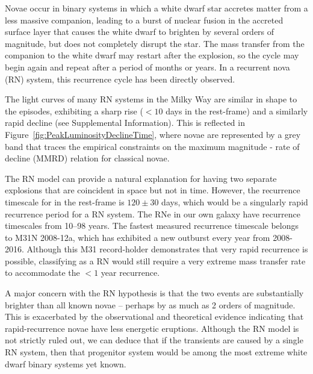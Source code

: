 \begin{multicols}{2}
Novae occur in binary systems in which a white dwarf star accretes
matter from a less massive companion, leading to a burst of nuclear
fusion in the accreted surface layer that causes the white dwarf to
brighten by several orders of magnitude, but does not completely
disrupt the star. The mass transfer from the companion to the white
dwarf may restart after the explosion, so the cycle may begin again
and repeat after a period of months or years.  In a recurrent nova
(RN) system, this recurrence cycle has been directly observed.

The light curves of many RN systems in the Milky Way are similar in
shape to the \spock episodes, exhibiting a sharp rise ($<10$ days in
the rest-frame) and a similarly rapid decline (see Supplemental
Information).  This is reflected in
Figure~\ref{fig:PeakLuminosityDeclineTime}, where novae are
represented by a grey band that traces the empirical constraints on
the maximum magnitude - rate of decline (MMRD) relation for classical
novae\cite{DellaValle:1995, Downes:2000, Shafter:2011,
  Kasliwal:2011a}.

The RN model can provide a natural explanation for having two separate
explosions that are coincident in space but not in time.  However, the
recurrence timescale for \spock in the rest-frame is $120\pm30$ days,
which would be a singularly rapid recurrence period for a RN system.
The RNe in our own galaxy have recurrence timescales from 10--98
years\cite{Schaefer:2010}.  The fastest measured recurrence timescale
belongs to M31N 2008-12a, which has exhibited a new outburst every
year from 2008-2016\cite{Tang:2014, Darnley:2014, Darnley:2015,
  Henze:2015, Henze:2015a, Darnley:2016}.  Although this M31
record-holder demonstrates that very rapid recurrence is possible,
classifying \spock as a RN would still require a very extreme mass
transfer rate to accommodate the $<1$ year recurrence.

A major concern with the RN hypothesis is that the two \spock events
are substantially brighter than all known novae -- perhaps by as much
as 2 orders of magnitude.  This is exacerbated by the observational
and theoretical evidence indicating that rapid-recurrence novae have
less energetic eruptions\cite{Yaron:2005}.
Although the RN model
is not strictly ruled out, we can deduce that if the \spock transients
are caused by a single RN system, then that progenitor system would be
among the most extreme white dwarf binary systems yet known.


\end{multicols}
